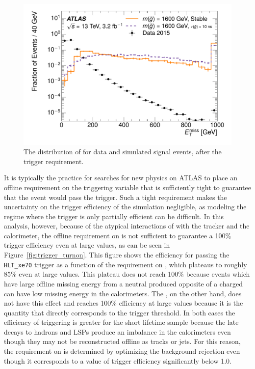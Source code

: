 \begin{figure}[h]
\centering
\includegraphics[width=\fullfig]{figures/selection_met_nm1_log.pdf}
\caption{The distribution of \met for data and simulated signal events, after the trigger requirement.}
\label{fig:nm1_met}
\end{figure}

It is typically the practice for searches for new physics on \ac{ATLAS} to place an offline requirement on the triggering variable that is sufficiently tight to guarantee that the event would pass the trigger.
Such a tight requirement makes the uncertainty on the trigger efficiency of the simulation negligible, as modeling the regime where the trigger is only partially efficient can be difficult.
In this analysis, however, because of the atypical interactions of \rhadrons with the tracker and the calorimeter, the offline requirement on \met is not sufficient to guarantee a 100\% trigger efficiency even at large values, as can be seen in Figure~\ref{fig:trigger_turnon}.
This figure shows the efficiency for passing the \texttt{HLT\_xe70} trigger as a function of the requirement on \met, which plateaus to roughly 85\% even at large values.
This plateau does not reach 100\% because events which have large offline missing energy from a neutral \rhadron produced opposite of a charged \rhadron can have low missing energy in the calorimeters.
The \calomet, on the other hand, does not have this effect and reaches 100\% efficiency at large values because it is the quantity that directly corresponds to the trigger threshold.
In both cases the efficiency of triggering is greater for the short lifetime sample because the late decays to hadrons and \acp{LSP} produce an imbalance in the calorimeters even though they may not be reconstructed offline as tracks or jets.
For this reason, the requirement on \met is determined by optimizing the background rejection even though it corresponds to a value of trigger efficiency significantly below 1.0.

